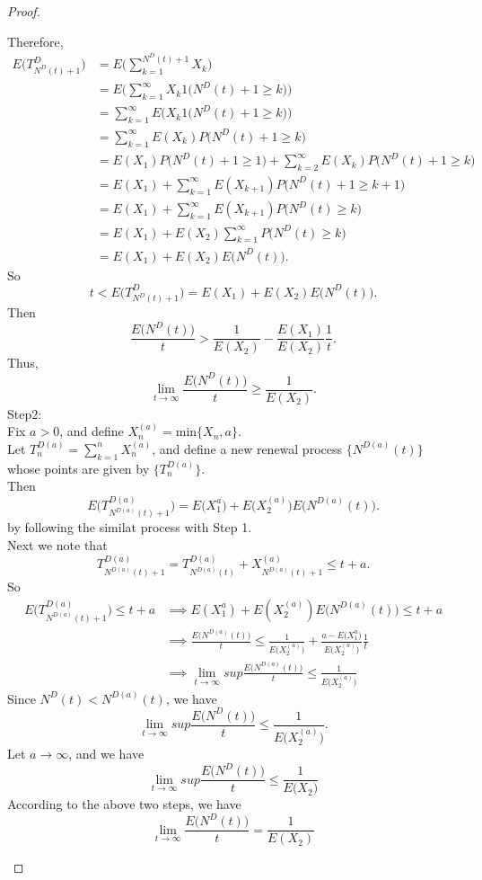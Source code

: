 \documentclass{amsart}
\theoremstyle{plain}
\theoremstyle{definition}
\begin{document}
\begin{proof}
\begin{enumerate}[(a)]
	Therefore,
	\begin{align*}
		E\big(T^D_{N^D(t)+1}\big)   &= E\Bigg( \sum_{k=1}^{N^D(t)+1}X_k \Bigg) \\
								  	&= E\Big( \sum_{k=1}^{\infty}X_k1\big({N^D(t)+1 \geq k}\big) \Big) \\
									&= \sum_{k=1}^{\infty}E\bigg(X_k1\big({N^D(t)+1 \geq k}\big)\bigg)\\
		 			   			   	&= \sum_{k=1}^{\infty}E(X_k)P\big({N^D(t)+1 \geq k}\big)\\
		 			   			   	&= E(X_1)P\big({N^D(t)+1 \geq 1}\big) + \sum_{k=2}^{\infty}E(X_k)P\big({N^D(t)+1 \geq k}\big)\\
		 			   			   	&= E(X_1) + \sum_{k=1}^{\infty}E(X_{k+1})P\big({N^D(t)+1 \geq k+1}\big)\\
		 			   			   	&= E(X_1) + \sum_{k=1}^{\infty}E(X_{k+1})P\big({N^D(t) \geq k}\big)\\
		 			   			   	&= E(X_1) + E(X_2)\sum_{k=1}^{\infty}P\big({N^D(t) \geq k}\big)\\
									&= E(X_1) +  E(X_2)E\big(N^D(t)\big).
	\end{align*}
	So 
	\[ t < E\big(T^D_{N^D(t)+1}\big)  = E(X_1) +  E(X_2)E\big(N^D(t)\big).\]
	Then 
	\[ \frac{E\big(N^D(t)\big)}{t} > \frac{1}{E(X_2)} - \frac{E(X_1)}{E(X_2)}\frac{1}{t}.\] 
	Thus,
	\[\lim_{t\to \infty }\frac{E\big(N^D(t)\big)}{t} \geq \frac{1}{E(X_2)}. \]
	Step2:\\
	Fix $a > 0$, and define $X_n^{(a)} = \text{min}\{X_n,a\}$.\\
	Let ${T^{D(a)}_n} = \sum_{k=1}^nX_n^{(a)}$, and define a new renewal process $\{N^{D(a)}(t)\}$ whose points are given by $\{T^{D(a)}_n\}$.\\
	Then 
	\[ E\Big( T^{D(a)}_{N^{D(a)}(t) + 1}\Big) = E\big(X_1^{a}\big) +  E\big(X_2^{(a)}\big)E\big(N^{D(a)}(t)\big).\]
	by following the similat process with Step 1.\\
	Next we note that 
	\[ T^{D(a)}_{N^{D(a)}(t) + 1} = T^{D(a)}_{N^{D(a)}(t)} + X_{N^{D(a)}(t) + 1}^{(a)} \leq t + a.\]
	So
	\begin{align*}
		E\Big( T^{D(a)}_{N^{D(a)}(t) + 1}\Big) \leq t+a & \implies
		E(X_1^{a}) +  E(X_2^{(a)})E\big(N^{D(a)}(t)\big) \leq t+a  \\
		& \implies \frac{E\big(N^{D(a)}(t)\big)}{t} \leq \frac{1}{E\big(X_2^{(a)}\big)}+\frac{a-E\big(X_1^a\big)}{E\big(X_2^{(a)}\big)}\frac{1}{t}\\
		& \implies \lim_{t\to \infty}sup \frac{E\big(N^{D(a)}(t)\big)}{t} \leq \frac{1}{E\big(X_2^{(a)}\big)}
	\end{align*}
	Since $N^D(t) < N^{D(a)}(t)$, we have 
	\[	\lim_{t\to \infty}sup \frac{E\big(N^D(t)\big)}{t} \leq \frac{1}{E\big(X_2^{(a)}\big)}. \]
	Let $a\to \infty$, and we have \\
	\[	\lim_{t\to \infty}sup \frac{E\big(N^D(t)\big)}{t} \leq \frac{1}{E\big(X_2\big)} \]
	According to the above two steps, we have
	\[	\lim_{t \to \infty} \frac{E\big(N^D(t) \big)}{t}  = \frac{1}{E(X_2)}\]
\end{enumerate}
\end{proof}
 
\end{document}
